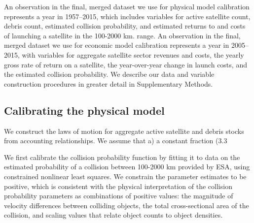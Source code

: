 \documentclass[9pt,twocolumn,twoside,lineno]{pnas-new}
\begin{document}
{	An observation in the final, merged dataset we use for physical model calibration represents a year in 1957–2015, which includes variables for active satellite count, debris count, estimated collision probability, and estimated returns to and costs of launching a satellite in the 100-2000 km. range.  An observation in the final, merged dataset we use for economic model calibration represents a year in 2005–2015, with variables for aggregate satellite sector revenues and costs, the yearly gross rate of return on a satellite, the year-over-year change in launch costs, and the estimated collision probability. We describe our data and variable construction procedures in greater detail in Supplementary Methods.
	
	\subsection*{Calibrating the physical model} 
	We construct the laws of motion for aggregate active satellite and debris stocks from accounting relationships. We assume that a) a constant fraction (3.3%
	
	We first calibrate the collision probability function by fitting it to data on the estimated probability of a collision between 100-2000 km provided by ESA, using constrained nonlinear least squares. We constrain the parameter estimates to be positive, which is consistent with the physical interpretation of the collision probability parameters as combinations of positive values: the magnitude of velocity differences between colliding objects, the total cross-sectional area of the collision, and scaling values that relate object counts to object densities.
	
}
\end{document}
